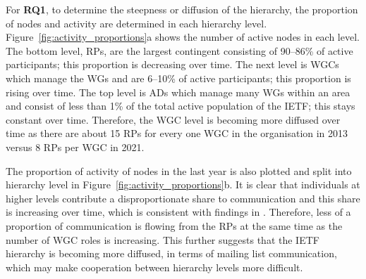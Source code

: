 \documentclass[twocolumn,10pt]{article}
\begin{document}

For \textbf{RQ1}, to determine the steepness or diffusion of the hierarchy,
the proportion of nodes and activity are determined in each hierarchy
level. Figure~\ref{fig:activity_proportions}a shows the number of active
nodes in each level. The bottom level, RPs, are the largest contingent
consisting of 90--86\% of active participants; this proportion is
decreasing over time. The next level is WGCs which manage the WGs and are
6--10\% of active participants; this proportion is rising over time. The
top level is ADs which manage many WGs within an area and consist of less
than 1\% of the total active population of the IETF; this stays constant
over time. Therefore, the WGC level is becoming more diffused over time as
there are about 15 RPs for every one WGC in the organisation in 2013 versus
8 RPs per WGC in 2021. 

The proportion of activity of nodes in the last year is also plotted and
split into hierarchy level in Figure~\ref{fig:activity_proportions}b. It is
clear that individuals at higher levels contribute a disproportionate share
to communication and this share is increasing over time, which is
consistent with findings in \cite{khare2022web}. Therefore, less of a
proportion of communication is flowing from the RPs at the same time as the
number of WGC roles is increasing. This further suggests that the IETF
hierarchy is becoming more diffused, in terms of mailing list
communication, which may make cooperation between hierarchy levels more
difficult.
\end{document}
